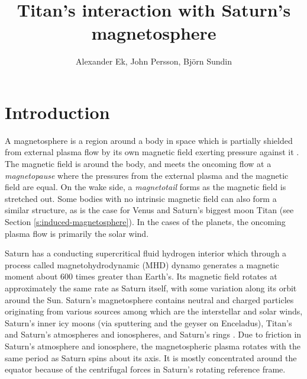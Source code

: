 \documentclass[12pt, parskip=full*, abstract]{scrartcl}
\title{Titan's interaction with Saturn's magnetosphere}
\author{Alexander Ek, John Persson, Björn Sundin}
\begin{document}
\maketitle
\vspace{5mm}

\newpage
\tableofcontents
\newpage

\section{Introduction}

A magnetosphere is a region around a body in space which is partially shielded from external plasma flow by its own magnetic field exerting pressure against it \parencite{encyclopedia-magnetospheres}. The magnetic field is  around the body, and meets the oncoming flow at a \textit{magnetopause} where the pressures from the external plasma and the magnetic field are equal. On the wake side, a \textit{magnetotail} forms as the magnetic field is stretched out. Some bodies with no intrinsic magnetic field can also form a similar structure, as is the case for Venus and Saturn's biggest moon Titan (see Section \ref{s:induced-magnetosphere}). In the cases of the planets, the oncoming plasma flow is primarily the solar wind. 

Saturn has a conducting supercritical fluid hydrogen interior which through a process called magnetohydrodynamic (MHD) dynamo generates a magnetic moment about 600 times greater than Earth's. Its magnetic field rotates at approximately the same rate as Saturn itself, with some variation along its orbit around the Sun. Saturn's magnetosphere contains neutral and charged particles originating from various sources among which are the interstellar and solar winds, Saturn's inner icy moons (via sputtering and the geyser on Enceladus), Titan's and Saturn's atmospheres and ionospheres, and Saturn's rings \parencite{solar-system-magnetospheres}. Due to friction in Saturn's atmosphere and ionosphere, the magnetospheric plasma rotates with the same period as Saturn spins about its axis. It is mostly concentrated around the equator because of the centrifugal forces in Saturn's rotating reference frame.
\end{document}
